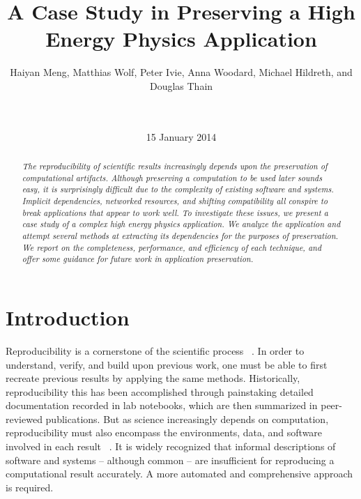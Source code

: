 \documentclass{acm_proc_article-sp}
\begin{document}
\title{A Case Study in Preserving a High Energy Physics Application}
\author{
Haiyan Meng, Matthias Wolf, Peter Ivie, Anna Woodard, Michael Hildreth, and Douglas Thain\\
\\
\\
}
\date{15 January 2014}
\maketitle

\begin{abstract}
\it The reproducibility of scientific results increasingly
depends upon the preservation of computational artifacts.
Although preserving a computation to be used later sounds
easy, it is surprisingly difficult due to the complexity
of existing software and systems.  Implicit dependencies,
networked resources, and shifting compatibility all conspire
to break applications that appear to work well.  To investigate
these issues, we present a case study of a complex high energy
physics application.  We analyze the application and attempt
several methods at extracting its dependencies for the purposes
of preservation.  We report on the completeness, performance,
and efficiency of each technique, and offer some guidance for
future work in application preservation.
\end{abstract}



\section{Introduction}

Reproducibility is a cornerstone of the scientific process ~\cite{borgman2012data}.
In order to understand, verify, and build upon previous work,
one must be able to first recreate previous results by applying
the same methods. Historically, reproducibility this has been
accomplished through painstaking detailed documentation recorded
in lab notebooks, which are then summarized in peer-reviewed publications.
But as science increasingly depends on computation,
reproducibility must also encompass the environments, data, and software
involved in each result ~\cite{zabolitzky2002preserving}. It is widely recognized that informal
descriptions of software and systems -- although common -- are insufficient
for reproducing a computational result accurately.
A more automated and comprehensive approach is required.
\end{document}
